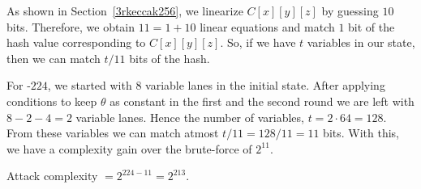 As shown in Section~\ref{3rkeccak256}, we linearize $C[x][y][z]$ by guessing $10$ bits. Therefore, we obtain $11 = 1 + 10$ linear equations and match $1$ bit of the hash value corresponding to $C[x][y][z]$. So, if we have $t$ variables in our state, then we can match $t/11$ bits of the hash.

For \Keccak-$224$, we started with $8$ variable lanes in the initial state. After applying conditions to keep $\theta$ as constant in the first and the second round we are left with $8 - 2 - 4 = 2$ variable lanes. Hence the number of variables, $t = 2\cdot 64 = 128$. From these variables we can match atmost $t/11 = 128/11 = 11$ bits. 
With this, we have a complexity gain over the brute-force of $2^{11}$.

Attack complexity $ = 2^{224 - 11} = 2^{213}$.